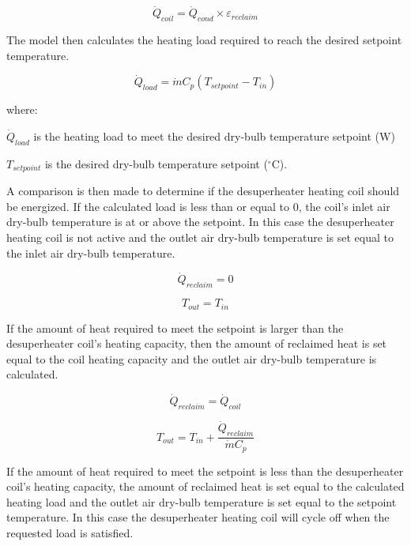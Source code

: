 \begin{equation}
{\dot Q_{coil}} = {\dot Q_{cond}} \times {\varepsilon_{reclaim}}
\end{equation}

The model then calculates the heating load required to reach the desired setpoint temperature.

\begin{equation}
{\dot Q_{load}} = \dot m{C_p}\left( {{T_{setpoint}} - {T_{in}}} \right)
\end{equation}

where:

\({\dot Q_{load}}\) is the heating load to meet the desired dry-bulb temperature setpoint (W)

\({T_{setpoint}}\) is the desired dry-bulb temperature setpoint (\(^{\circ}\)C).

A comparison is then made to determine if the desuperheater heating coil should be energized. If the calculated load is less than or equal to 0, the coil's inlet air dry-bulb temperature is at or above the setpoint. In this case the desuperheater heating coil is not active and the outlet air dry-bulb temperature is set equal to the inlet air dry-bulb temperature.

\begin{equation}
{\dot Q_{reclaim}} = 0
\end{equation}

\begin{equation}
{T_{out}}{\mathrm{ }} = {\mathrm{ }}{T_{in}}
\end{equation}

If the amount of heat required to meet the setpoint is larger than the desuperheater coil's heating capacity, then the amount of reclaimed heat is set equal to the coil heating capacity and the outlet air dry-bulb temperature is calculated.

\begin{equation}
{\dot Q_{reclaim}} = {\dot Q_{coil}}
\end{equation}

\begin{equation}
{T_{out}} = {T_{in}} + \frac{{{{\dot Q}_{reclaim}}}}{{\dot m{C_p}}}
\end{equation}

If the amount of heat required to meet the setpoint is less than the desuperheater coil's heating capacity, the amount of reclaimed heat is set equal to the calculated heating load and the outlet air dry-bulb temperature is set equal to the setpoint temperature. In this case the desuperheater heating coil will cycle off when the requested load is satisfied.

